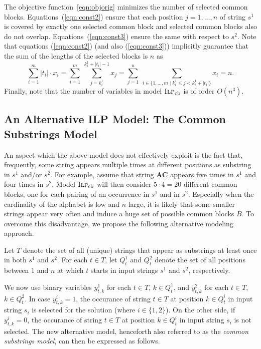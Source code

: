 \documentclass[11pt,a4paper]{article}
\newcommand{\MIPorig}{\textsc{Ilp}_{\mathrm{cb}}}
\begin{document}
The objective function~\eqref{eqn:objorig} minimizes the number of selected common
blocks. Equations~(\ref{eqn:const2}) ensure that each position
$j=1,\ldots,n$ of string $s^1$ is covered by exactly one selected common block
and selected common blocks also do not overlap.
Equations~(\ref{eqn:const3}) ensure the same with respect to $s^2$. 
Note that equations (\ref{eqn:const2}) (and also (\ref{eqn:const3})) implicitly
guarantee that the sum of the lengths of the selected blocks is $n$ as
\begin{equation*}
\sum_{i=1}^m |t_i| \cdot x_i =
  \sum_{i=1}^m\ \sum_{j=k^1_i}^{k^1_i+|t_i|-1} x_j =
  \sum_{j=1}^n\ \sum_{i\in \{1,\ldots,m \mid k^1_i \le j <
  k^1_i+|t_i|\}} x_i = n. 
\end{equation*}
Finally, note that the number of variables in model $\MIPorig$ is of order $O(n^3)$.

\subsection{An Alternative ILP Model: The Common Substrings Model}

An aspect which the above model does not effectively exploit is the fact that,
frequently, some string appears multiple times at different positions
as substring in $s^1$ and/or $s^2$. 
For example, assume that string \textbf{AC} appears five times in $s^1$ and
four times in $s^2$. Model $\MIPorig$ will then
consider $5\cdot 4=20$ different common blocks, one for each pairing of
an occurrence in $s^1$ and in $s^2$. Especially when the cardinality of the
alphabet is low and $n$ large, it is likely that some smaller strings
appear very often and induce a huge set of possible common blocks $B$.
To overcome this disadvantage, we propose the following alternative
modeling approach.

Let $T$ denote the set of all (unique) strings that appear as substrings
at least once in both $s^1$ and $s^2$. For each $t \in T$, let $Q^1_{t}$
and $Q^2_t$ denote the set of all positions between $1$
and $n$ at which $t$ starts in input strings $s^1$ and $s^2$,
respectively.


We now use binary variables $y_{t,k}^1$ for each $t \in T$, $k \in Q^1_t$, and $y_{t,k}^2$ for each $t \in T$, $k \in Q^2_t$. In case $y_{t,k}^i = 1$, the occurance of string $t \in T$ at position $k \in Q^i_{t}$ in input string $s_i$ is selected for the solution (where $i \in \{1,2\}$). On the other side, if $y_{t,k}^i = 0$, the occurance of string $t \in T$ at position $k \in Q^i_{t}$ in input string $s_i$ is not selected. The new alternative model, henceforth also referred to as the \emph{common substrings model}, can then be expressed as follows.
\end{document}
